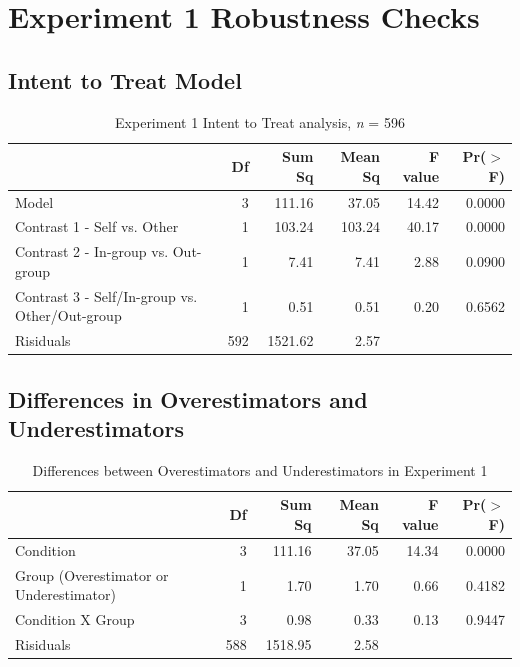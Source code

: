 \documentclass[12pt,]{article}
\begin{document}
\clearpage
\section{Experiment 1 Robustness Checks}
\label{appendix:study1_robust}


\subsection{Intent to Treat Model}
\label{appendix:itt1}


\begin{table}[ht]
\centering
\begin{tabular}{lrrrrr}
  \hline
 & Df & Sum Sq & Mean Sq & F value & Pr($>$F) \\ 
  \hline
Model & 3 & 111.16 & 37.05 & 14.42 & 0.0000 \\ 
  Contrast 1 - Self vs. Other & 1 & 103.24 & 103.24 & 40.17 & 0.0000 \\ 
  Contrast 2 - In-group vs. Out-group & 1 & 7.41 & 7.41 & 2.88 & 0.0900 \\ 
  Contrast 3 - Self/In-group vs. Other/Out-group & 1 & 0.51 & 0.51 & 0.20 & 0.6562 \\ 
  Risiduals & 592 & 1521.62 & 2.57 &  &  \\ 
   \hline
\end{tabular}
\caption{Experiment 1 Intent to Treat analysis, \emph{n} = 596} 
\label{ITT_s1}
\end{table}


\clearpage
\subsection{Differences in Overestimators and Underestimators}
\label{appendix:over_under1}

\begin{table}[ht]
\centering
\begin{tabular}{lrrrrr}
  \hline
 & Df & Sum Sq & Mean Sq & F value & Pr($>$F) \\ 
  \hline
Condition & 3 & 111.16 & 37.05 & 14.34 & 0.0000 \\ 
  Group (Overestimator or Underestimator) & 1 & 1.70 & 1.70 & 0.66 & 0.4182 \\ 
  Condition X Group & 3 & 0.98 & 0.33 & 0.13 & 0.9447 \\ 
  Risiduals & 588 & 1518.95 & 2.58 &  &  \\ 
   \hline
\end{tabular}
\caption{Differences between Overestimators and Underestimators in Experiment 1} 
\label{over_underS1}
\end{table}
\end{document}
